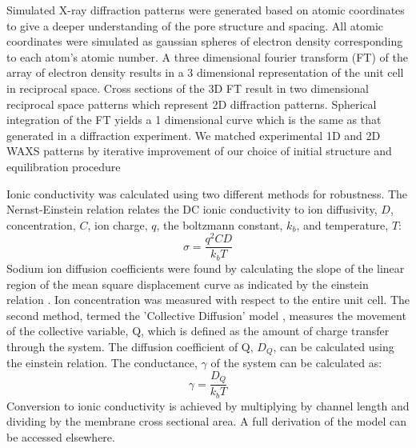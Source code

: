 Simulated X-ray diffraction patterns were generated based on atomic
coordinates to give a deeper understanding of the pore structure and
spacing. All atomic coordinates were simulated as gaussian spheres of
electron density  corresponding to each atom's atomic number. A three
dimensional fourier transform (FT) of the array of electron density 
results in a 3 dimensional representation of the unit cell in reciprocal
space. Cross sections of the 3D FT result in two dimensional reciprocal
space patterns which represent 2D diffraction patterns. Spherical
integration of the FT yields a 1 dimensional curve which is the same
as that generated in a diffraction experiment. We matched experimental
1D and 2D WAXS patterns by iterative improvement of our choice of 
initial structure and equilibration procedure 

Ionic conductivity was calculated using two different methods for
robustness. The Nernst-Einstein relation relates 
the DC ionic conductivity to ion diffusivity, $D$, concentration,
$C$, ion charge, $q$, the boltzmann constant, $k_b$, and temperature,
$T$: $$\sigma = \dfrac{q^2CD}{k_b T}$$ Sodium ion diffusion 
coefficients were found by calculating the slope of the linear
region of the mean square displacement curve as indicated by the einstein relation
\cite{einstein_investigations_1956}. Ion concentration was measured with
respect to the entire unit cell. The second method, termed the 'Collective
Diffusion' model \cite{liu_collective_2013}, measures the movement of
the collective variable, Q, which is defined as the amount of charge 
transfer through the system. The diffusion coefficient of Q, $D_Q$, can
be calculated using the einstein relation. The conductance, $\gamma$ of
the system can be calculated as: $$ \gamma = \dfrac{D_Q}{k_b T} $$ 
Conversion to ionic conductivity is achieved by multiplying by channel 
length and dividing by the membrane cross sectional area. A full 
derivation of the model can be accessed elsewhere\cite{liu_collective_2013}.  
